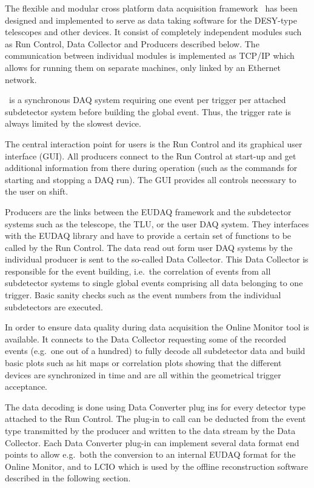 
The flexible and modular cross platform data acquisition framework \eudaq\ has been designed and implemented to serve as data taking software for the DESY-type telescopes and other devices. 
It consist of completely independent modules such as Run Control, Data Collector and Producers described below. 
The communication between individual modules is implemented as TCP/IP which allows for running them on separate machines, only linked by an Ethernet network.

\eudaq\ is a synchronous DAQ system requiring one event per trigger per attached subdetector system before building the global event. 
Thus, the trigger rate is always limited by the slowest device.

The central interaction point for users is the Run Control and its graphical user interface (GUI). 
All producers connect to the Run Control at start-up and get additional information from there during operation (such as the commands for starting and stopping a DAQ run). 
The GUI provides all controls necessary to the user on shift. 

Producers are the links between the EUDAQ framework and the subdetector systems such as the telescope, the TLU, or the user DAQ system. 
They interfaces with the EUDAQ library and have to provide a certain set of functions to be called by the Run Control. 
The data read out form user DAQ systems by the individual producer is sent to the so-called Data Collector. 
This Data Collector is responsible for the event building, i.e.\ the correlation of events from all subdetector systems to single global events comprising all data belonging to one trigger. 
Basic sanity checks such as the event numbers from the individual subdetectors are executed.

In order to ensure data quality during data acquisition the Online Monitor tool is available. 
It connects to the Data Collector requesting some of the recorded events (e.g.\ one out of a hundred)
 to fully decode all subdetector data and build basic plots such as hit maps or correlation plots showing
  that the different devices are synchronized in time and are all within the geometrical trigger acceptance.

The data decoding is done using Data Converter plug ins for every detector type attached to the Run Control. 
The plug-in to call can be deducted from the event type transmitted by the producer and written to the data stream by the Data Collector. 
Each Data Converter plug-in can implement several data format end points to allow e.g.\ both the conversion to an internal EUDAQ format for the Online Monitor,
 and to LCIO which is used by the offline reconstruction software described in the following section.

